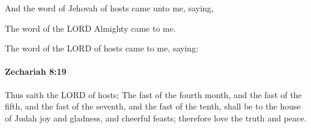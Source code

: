 			\begin{versebox}
					\item[BHS] 
					\item[LXX] 
					\item[ASV] And the word of Jehovah of hosts came unto me, saying,
					\item[NIV] The word of the LORD Almighty came to me.
					\item[NRSV] The word of the LORD of hosts came to me, saying:
			\end{versebox}

		\paragraph{Zechariah 8:19} %
			\label{ZECHARIAH-8-19}

			Thus saith the LORD of hosts; The fast of the fourth month, and the fast of the fifth, and the fast of the seventh, and the fast of the tenth, shall be to the house of Judah joy and gladness, and cheerful feasts; therefore love the truth and peace.

